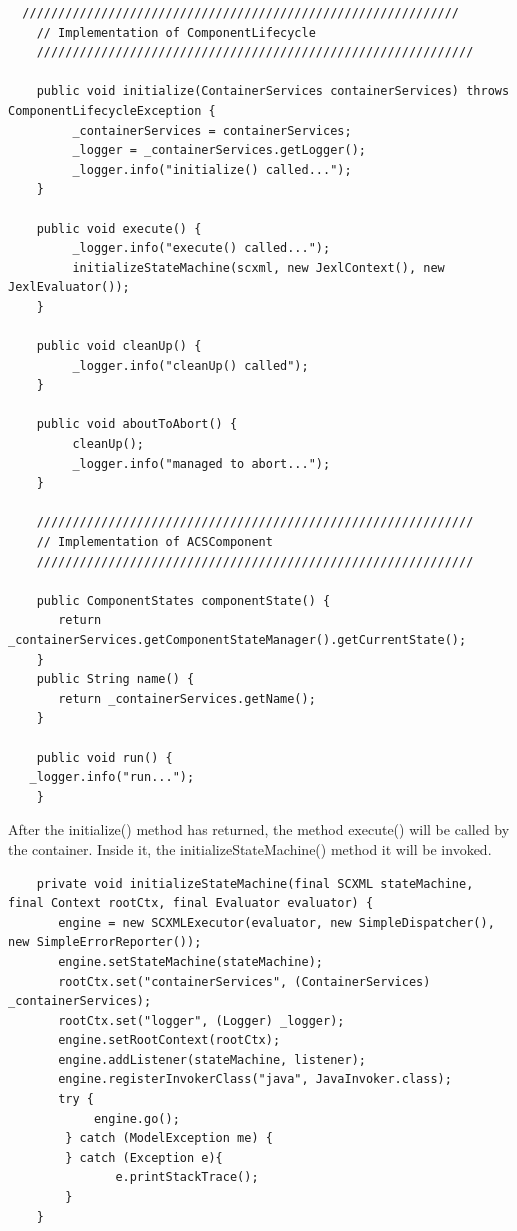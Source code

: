 \documentclass[]{article}
\begin{document}
\begin{lstlisting}
  /////////////////////////////////////////////////////////////
    // Implementation of ComponentLifecycle
    /////////////////////////////////////////////////////////////
    
    public void initialize(ContainerServices containerServices) throws ComponentLifecycleException {
         _containerServices = containerServices;
         _logger = _containerServices.getLogger();
         _logger.info("initialize() called...");
    }
    
    public void execute() {
         _logger.info("execute() called...");
         initializeStateMachine(scxml, new JexlContext(), new JexlEvaluator());
    }
    
    public void cleanUp() {
         _logger.info("cleanUp() called");
    }
    
    public void aboutToAbort() {
         cleanUp();
         _logger.info("managed to abort...");
    }

    /////////////////////////////////////////////////////////////
    // Implementation of ACSComponent
    /////////////////////////////////////////////////////////////
    
    public ComponentStates componentState() {
       return _containerServices.getComponentStateManager().getCurrentState();
    }
    public String name() {
       return _containerServices.getName();
    }

    public void run() {
   _logger.info("run...");
    }

\end{lstlisting}

After the  \textsf{initialize()} method has returned, the method  \textsf{execute()} will be called by the container. Inside it, the  \textsf{initializeStateMachine()} method it will be invoked. 

\begin{lstlisting}
    private void initializeStateMachine(final SCXML stateMachine, final Context rootCtx, final Evaluator evaluator) {
       engine = new SCXMLExecutor(evaluator, new SimpleDispatcher(), new SimpleErrorReporter());
       engine.setStateMachine(stateMachine);
       rootCtx.set("containerServices", (ContainerServices) _containerServices);
       rootCtx.set("logger", (Logger) _logger);
       engine.setRootContext(rootCtx);
       engine.addListener(stateMachine, listener);
       engine.registerInvokerClass("java", JavaInvoker.class);
       try {
            engine.go();
        } catch (ModelException me) {
        } catch (Exception e){
               e.printStackTrace();
        }
    }
\end{lstlisting}
\end{document}
